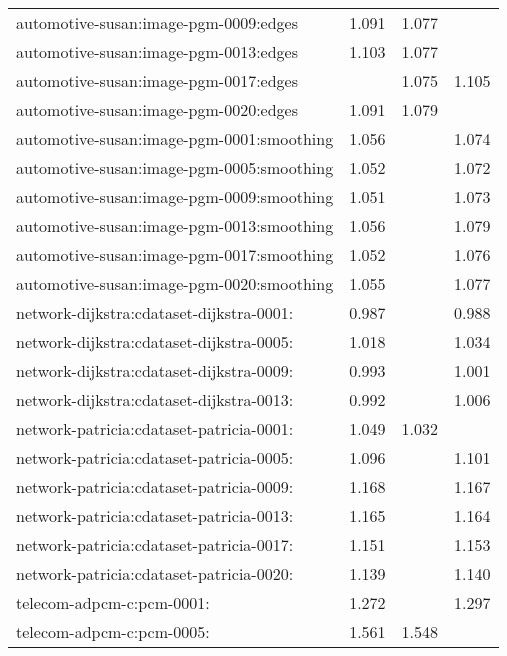 \begin{longtable}{lrrr}
automotive-susan:image-pgm-0009:edges & 1.091 & 1.077 & \color{Green}{1.092} \\
automotive-susan:image-pgm-0013:edges & 1.103 & 1.077 & \color{Green}{1.106} \\
automotive-susan:image-pgm-0017:edges & \color{Green}{1.108} & 1.075 & 1.105 \\
automotive-susan:image-pgm-0020:edges & 1.091 & 1.079 & \color{Green}{1.094} \\
automotive-susan:image-pgm-0001:smoothing & 1.056 & \color{Green}{1.077} & 1.074 \\
automotive-susan:image-pgm-0005:smoothing & 1.052 & \color{Green}{1.079} & 1.072 \\
automotive-susan:image-pgm-0009:smoothing & 1.051 & \color{Green}{1.074} & 1.073 \\
automotive-susan:image-pgm-0013:smoothing & 1.056 & \color{Green}{1.081} & 1.079 \\
automotive-susan:image-pgm-0017:smoothing & 1.052 & \color{Green}{1.077} & 1.076 \\
automotive-susan:image-pgm-0020:smoothing & 1.055 & \color{Green}{1.079} & 1.077 \\
network-dijkstra:cdataset-dijkstra-0001: & 0.987 & \color{Green}{1.016} & 0.988 \\
network-dijkstra:cdataset-dijkstra-0005: & 1.018 & \color{Green}{1.041} & 1.034 \\
network-dijkstra:cdataset-dijkstra-0009: & 0.993 & \color{Green}{1.020} & 1.001 \\
network-dijkstra:cdataset-dijkstra-0013: & 0.992 & \color{Green}{1.019} & 1.006 \\
network-patricia:cdataset-patricia-0001: & 1.049 & 1.032 & \color{Green}{1.053} \\
network-patricia:cdataset-patricia-0005: & 1.096 & \color{Green}{1.107} & 1.101 \\
network-patricia:cdataset-patricia-0009: & 1.168 & \color{Green}{1.182} & 1.167 \\
network-patricia:cdataset-patricia-0013: & 1.165 & \color{Green}{1.174} & 1.164 \\
network-patricia:cdataset-patricia-0017: & 1.151 & \color{Green}{1.173} & 1.153 \\
network-patricia:cdataset-patricia-0020: & 1.139 & \color{Green}{1.145} & 1.140 \\
telecom-adpcm-c:pcm-0001: & 1.272 & \color{Green}{1.301} & 1.297 \\
telecom-adpcm-c:pcm-0005: & 1.561 & 1.548 & \color{Green}{1.574} \\

\end{longtable}

